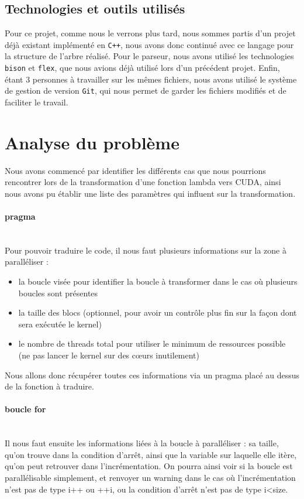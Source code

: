 \documentclass{article}
\begin{document}
	\subsection{Technologies et outils utilisés}
	
	Pour ce projet, comme nous le verrons plus tard, nous sommes partis d'un projet déjà existant implémenté en \verb|C++|, nous avons donc continué avec ce langage pour la structure de l'arbre réalisé.
	Pour le parseur, nous avons utilisé les technologies \verb|bison| et \verb|flex|, que nous avions déjà utilisé lors d'un précédent projet.
	Enfin, étant 3 personnes à travailler sur les mêmes fichiers, nous avons utilisé le système de gestion de version \verb|Git|, qui nous permet de garder les fichiers modifiés et de faciliter le travail.
	
	\newpage	
	
	\section{Analyse du problème}
	Nous avons commencé par identifier les différents cas que nous pourrions rencontrer lors de la transformation d'une fonction lambda vers CUDA, ainsi nous avons pu établir une liste des paramètres qui influent sur la transformation.
	
	\paragraph{pragma}
	~~\\
	\indent
	Pour pouvoir traduire le code, il nous faut plusieurs informations sur la zone à paralléliser : 
	\begin{itemize}
		\item la boucle visée pour identifier la boucle à transformer dans le cas où plusieurs boucles sont présentes
		\item la taille des blocs (optionnel, pour avoir un contrôle plus fin sur la façon dont sera exécutée le kernel)
		\item le nombre de threads total pour utiliser le minimum de ressources possible (ne pas lancer le kernel sur des cœurs inutilement)
	\end{itemize}		
	Nous allons donc récupérer toutes ces informations via un pragma placé au dessus de la fonction à traduire.
	
	\paragraph{boucle for}
	~~\\
	\indent
	Il nous faut ensuite les informations liées à la boucle à paralléliser : sa taille, qu'on trouve dans la condition d'arrêt, ainsi que la variable sur laquelle elle itère, qu'on peut retrouver dans l'incrémentation. On pourra ainsi voir si la boucle est parallélisable simplement, et renvoyer un warning dans le cas où l'incrémentation n'est pas de type i++ ou ++i, ou la condition d'arrêt n'est pas de type i\textless size.	
	
\end{document}
